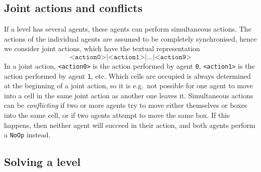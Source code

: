 \documentclass[12pt,a4paper]{article}
\begin{document}
\subsection{Joint actions and conflicts}
If a level has several agents, these agents can perform simultaneous actions. The actions of the individual agents are assumed to be completely synchronised, hence we consider joint actions, which have the textual representation
\[
  \texttt{<action0>|<action1>|...|<action9>}
\]
In a joint action, \texttt{<action0>} is the action performed by agent \texttt{0}, \texttt{<action1>} is the action performed by agent \texttt{1}, etc. Which cells are occupied is always determined at the beginning of a joint action, so it is e.g.\ not possible for one agent to move into a cell in the same joint action as another one leaves it. Simultaneous actions can be \emph{conflicting} if two or more agents try to move either themselves or boxes into the same cell, or if two agents attempt to move the same box. If this happens, then neither agent will succeed in their action, and both agents perform a \texttt{NoOp} instead.

\subsection{Solving a level}
\end{document}
